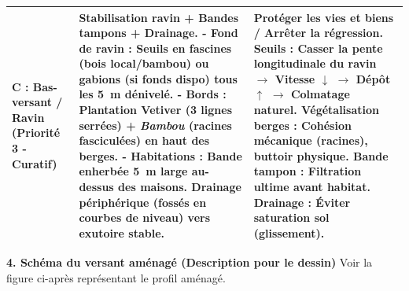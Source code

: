 \documentclass[11pt]{article}
\begin{document}
\begin{exoresolu}
\begin{center}
\begin{tabularx}{\linewidth}{|l|X|l|}
\textbf{C : Bas-versant / Ravin (Priorité 3 - Curatif)} & \textbf{Stabilisation ravin + Bandes tampons + Drainage.} \newline - \textbf{Fond de ravin :} Seuils en fascines (bois local/bambou) ou gabions (si fonds dispo) tous les \SI{5}{m} dénivelé. \newline - \textbf{Bords :} Plantation Vetiver (3 lignes serrées) + \emph{Bambou} (racines fasciculées) en haut des berges. \newline - \textbf{Habitations :} Bande enherbée \SI{5}{m} large au-dessus des maisons. Drainage périphérique (fossés en courbes de niveau) vers exutoire stable. & \textbf{Protéger les vies et biens / Arrêter la régression.} \newline Seuils : Casser la pente longitudinale du ravin $\rightarrow$ Vitesse $\downarrow$ $\rightarrow$ Dépôt $\uparrow$ $\rightarrow$ Colmatage naturel. \newline Végétalisation berges : Cohésion mécanique (racines), buttoir physique. \newline Bande tampon : Filtration ultime avant habitat. Drainage : Éviter saturation sol (glissement). \\ \hline
\end{tabularx}
\end{center}

\noindent\textbf{4. Schéma du versant aménagé (Description pour le dessin)}
Voir la figure ci-après représentant le profil aménagé.


\end{exoresolu}
\end{document}
